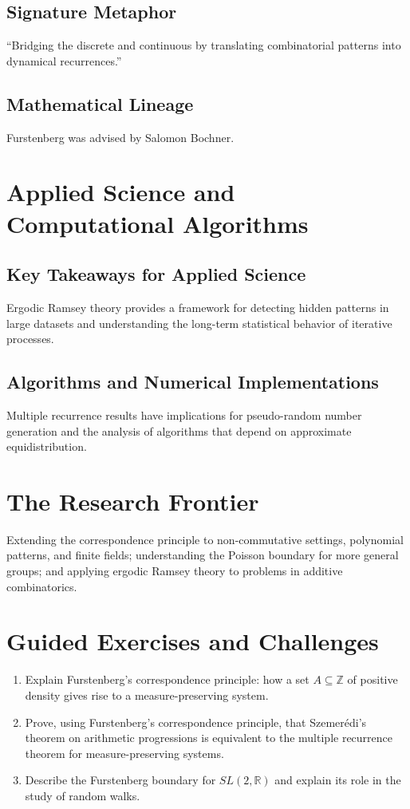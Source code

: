 \subsection{Signature Metaphor}
``Bridging the discrete and continuous by translating combinatorial patterns into dynamical recurrences.''

\subsection{Mathematical Lineage}
Furstenberg was advised by Salomon Bochner.

\section{Applied Science and Computational Algorithms}
\subsection{Key Takeaways for Applied Science}
Ergodic Ramsey theory provides a framework for detecting hidden patterns in large datasets and understanding the long-term statistical behavior of iterative processes.

\subsection{Algorithms and Numerical Implementations}
Multiple recurrence results have implications for pseudo-random number generation and the analysis of algorithms that depend on approximate equidistribution.

\section{The Research Frontier}
Extending the correspondence principle to non-commutative settings, polynomial patterns, and finite fields; understanding the Poisson boundary for more general groups; and applying ergodic Ramsey theory to problems in additive combinatorics.

\section{Guided Exercises and Challenges}
\begin{enumerate}[label=\textbf{\arabic*.}]
  \item Explain Furstenberg's correspondence principle: how a set $A \subseteq \mathbb{Z}$ of positive density gives rise to a measure-preserving system.
  \item Prove, using Furstenberg's correspondence principle, that Szemer\'edi's theorem on arithmetic progressions is equivalent to the multiple recurrence theorem for measure-preserving systems.
  \item Describe the Furstenberg boundary for $SL(2,\mathbb{R})$ and explain its role in the study of random walks.
\end{enumerate}

